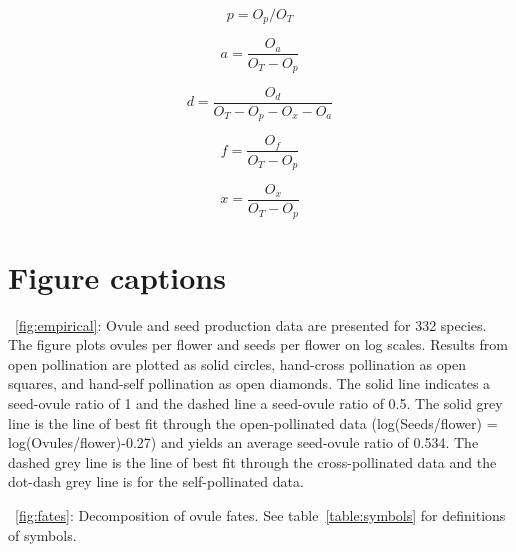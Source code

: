 \documentclass[letterpaper,titlepage]{scrartcl}
\newcommand{\tref}{table} \newcommand{\eref}{equation}
\begin{document}
\begin{equation}
  p=O_{p}/O_{T}
\end{equation}

\begin{equation}
  a=\frac{O_{a}}{O_{T}-O_{p}}
\end{equation}

\begin{equation}
  d =\frac{O_{d}}{O_{T}-O_{p}-O_{x}-O_{a}}
\end{equation}

\begin{equation}
  f =\frac{O_{f}}{O_{T}-O_{p}}
\end{equation}

\begin{equation}
  x =\frac{O_{x}}{O_{T}-O_{p}}
\end{equation}



\newpage
\section{Figure captions} {\fref}~\ref{fig:empirical}: Ovule and seed
production data are presented for 332 species. The figure plots ovules
per flower and seeds per flower on log scales. Results from open
pollination are plotted as solid circles, hand-cross pollination as
open squares, and hand-self pollination as open diamonds. The solid
line indicates a seed-ovule ratio of 1 and the dashed line a
seed-ovule ratio of 0.5. The solid grey line is the line of best fit
through the open-pollinated data (log(Seeds/flower) =
log(Ovules/flower)-0.27) and yields an average seed-ovule ratio of
0.534. The dashed grey line is the line of best fit through the
cross-pollinated data and the dot-dash grey line is for the
self-pollinated data.

{\fref}~\ref{fig:fates}: Decomposition of ovule fates. See
{\tref}~\ref{table:symbols} for definitions of symbols.
\end{document}
